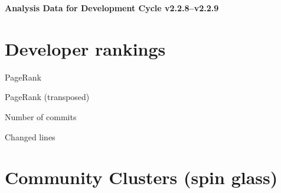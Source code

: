 \documentclass{article}
\begin{document}
\setlength{\parindent}{0pt}
\begin{center}
\begin{Large}
\textbf{Analysis Data for Development Cycle v2.2.8--v2.2.9}
\end{Large}
\end{center}
\section{Developer rankings}
\begin{small}\renewcommand{\tabcolsep}{1pt}
\begin{minipage}{0.5\linewidth}
PageRank\\

\end{minipage}%
\begin{minipage}{0.5\linewidth}
PageRank (transposed)\\

\end{minipage}

\renewcommand{\tabcolsep}{5pt}
\begin{minipage}{0.5\linewidth}
Number of commits\\

\end{minipage}%
\begin{minipage}{0.5\linewidth}
Changed lines\\

\end{minipage}
\end{small}
\newpage\section{Community Clusters (spin glass)}
\end{document}

